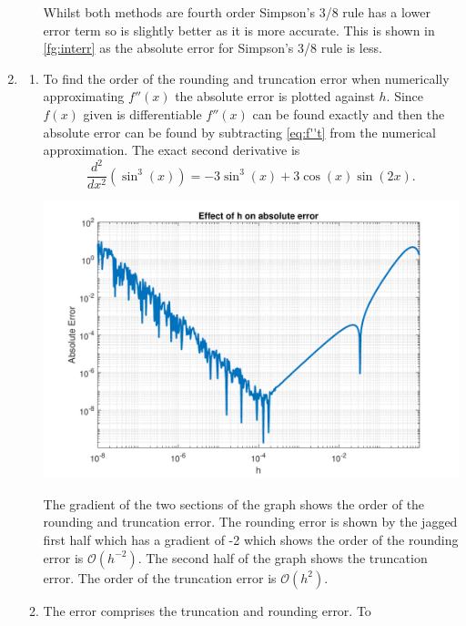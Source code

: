 \documentclass[a4paper,11pt]{article}
\begin{document}
\begin{enumerate}
\begin{enumerate}
		Whilst both methods are fourth order Simpson's 3/8 rule has a lower 
		error term so is slightly better as it is more accurate. This is 
		shown in \autoref{fg:interr} as the absolute error for Simpson's 
		3/8 rule is less.
	\end{enumerate}

	
	\item \begin{enumerate}
		\item To find the order of the rounding and truncation error when 
		numerically approximating $f''(x)$ the absolute error is plotted 
		against $h$. Since $f(x)$ given is differentiable 
		$f''(x)$ can be found exactly and then the absolute error can be 
		found by subtracting \autoref{eq:f''t} from the numerical 
		approximation. The exact second derivative is
		\begin{equation}
			\frac{d^{2}}{dx^{2}}(\sin^{3}(x)) = -3\sin^{3}(x) + 
			3\cos(x)\sin(2x).
			\label{eq:f''t}
		\end{equation}
		\begin{center}
			\includegraphics[scale=0.7]{images/Q2bi.pdf}
		\end{center}
		The gradient of the two sections of the graph shows the order of the 
		rounding and truncation error. The rounding error is shown by the 
		jagged first half which has a gradient of -2 which shows the order of 
		the rounding error is $\mathcal{O}(h^{-2})$. The second half of the 
		graph shows the truncation error. The order of the truncation error 
		is $\mathcal{O}(h^{2})$.
		\item The error comprises the truncation and rounding error. To 

\end{enumerate}
\end{enumerate}
\end{document}
